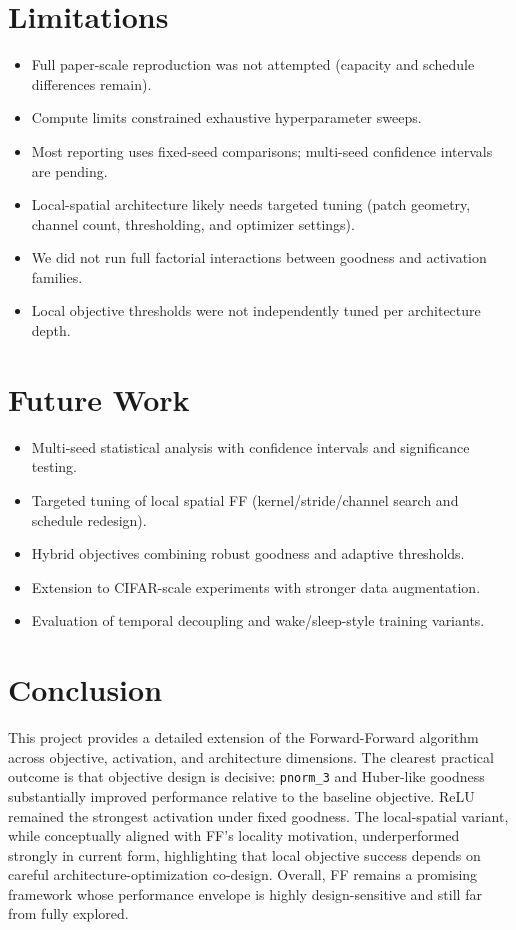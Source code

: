 \documentclass[sigconf]{acmart}
\begin{document}
\section{Limitations}
\begin{itemize}
  \item Full paper-scale reproduction was not attempted (capacity and schedule differences remain).
  \item Compute limits constrained exhaustive hyperparameter sweeps.
  \item Most reporting uses fixed-seed comparisons; multi-seed confidence intervals are pending.
  \item Local-spatial architecture likely needs targeted tuning (patch geometry, channel count, thresholding, and optimizer settings).
  \item We did not run full factorial interactions between goodness and activation families.
  \item Local objective thresholds were not independently tuned per architecture depth.
\end{itemize}

\section{Future Work}
\begin{itemize}
  \item Multi-seed statistical analysis with confidence intervals and significance testing.
  \item Targeted tuning of local spatial FF (kernel/stride/channel search and schedule redesign).
  \item Hybrid objectives combining robust goodness and adaptive thresholds.
  \item Extension to CIFAR-scale experiments with stronger data augmentation.
  \item Evaluation of temporal decoupling and wake/sleep-style training variants.
\end{itemize}

\section{Conclusion}
This project provides a detailed extension of the Forward-Forward algorithm across objective, activation, and architecture dimensions. The clearest practical outcome is that objective design is decisive: \texttt{pnorm\_3} and Huber-like goodness substantially improved performance relative to the baseline objective. ReLU remained the strongest activation under fixed goodness. The local-spatial variant, while conceptually aligned with FF's locality motivation, underperformed strongly in current form, highlighting that local objective success depends on careful architecture-optimization co-design. Overall, FF remains a promising framework whose performance envelope is highly design-sensitive and still far from fully explored.
\end{document}

